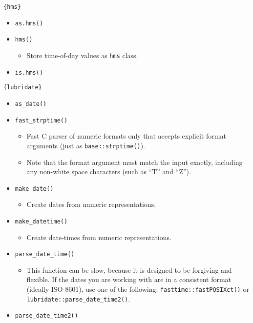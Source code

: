 \documentclass[
]{book}
\providecommand{\tightlist}{%
  \setlength{\itemsep}{0pt}\setlength{\parskip}{0pt}}
\begin{document}
\texttt{\{hms\}}

\begin{itemize}
\tightlist
\item
  \texttt{as.hms()}
\item
  \texttt{hms()}

  \begin{itemize}
  \tightlist
  \item
    Store time-of-day values as \texttt{hms} class.
  \end{itemize}
\item
  \texttt{is.hms()}
\end{itemize}

\texttt{\{lubridate\}}

\begin{itemize}
\tightlist
\item
  \texttt{as\_date()}
\item
  \texttt{fast\_strptime()}

  \begin{itemize}
  \tightlist
  \item
    Fast C parser of numeric formats only that accepts explicit format arguments (just as \texttt{base::strptime()}).
  \item
    Note that the format argument must match the input exactly, including any non-white space characters (such as ``T'' and ``Z'').
  \end{itemize}
\item
  \texttt{make\_date()}

  \begin{itemize}
  \tightlist
  \item
    Create dates from numeric representations.
  \end{itemize}
\item
  \texttt{make\_datetime()}

  \begin{itemize}
  \tightlist
  \item
    Create date-times from numeric representations.
  \end{itemize}
\item
  \texttt{parse\_date\_time()}

  \begin{itemize}
  \tightlist
  \item
    This function can be slow, because it is designed to be forgiving and flexible. If the dates you are working with are in a consistent format (ideally ISO 8601), use one of the following: \texttt{fasttime::fastPOSIXct()} or \texttt{lubridate::parse\_date\_time2()}.
  \end{itemize}
\item
  \texttt{parse\_date\_time2()}


\end{itemize}
\end{document}

